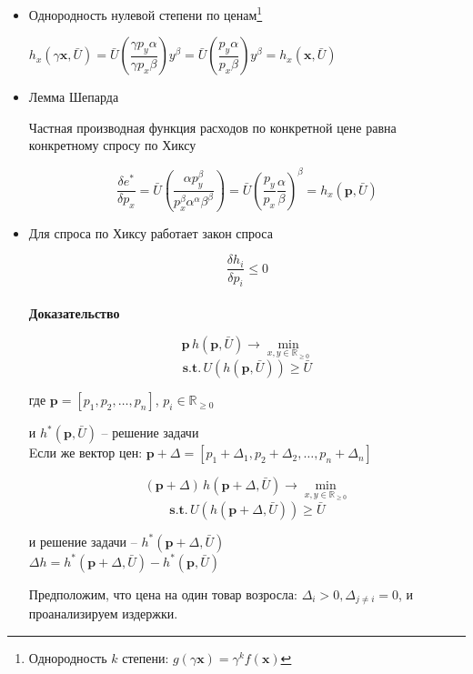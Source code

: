 \documentclass[reqno]{article}
\theoremstyle{definition}
\theoremstyle{definition}
\theoremstyle{definition}
\theoremstyle{definition}
\theoremstyle{definition}
\theoremstyle{definition}
\theoremstyle{definition}
\theoremstyle{definition}
\theoremstyle{definition}
\begin{document}
	\begin{itemize}
		\item Однородность нулевой степени по ценам\footnote{Однородность $k$ степени: $g(\gamma \textbf{x})=\gamma^k f(\textbf{x})$}
		
		$h_x(\gamma \textbf{x},\bar{U}) = \bar{U} \left(\dfrac{\gamma p_y \alpha}{\gamma p_x \beta} \right)y^\beta = \bar{U} \left(\dfrac{p_y \alpha}{p_x \beta} \right)y^\beta = h_x(\textbf{x},\bar{U})$ 
		\\
		 
		\item Лемма Шепарда 
		
		Частная производная функция расходов по конкретной цене равна конкретному спросу по Хиксу
		
		$$\dfrac{\delta e^*}{\delta p_x} = \bar{U} \left(\dfrac{\alpha p_y^\beta}{p_x^\beta \alpha^\alpha \beta^\beta} \right) = \bar{U} \left( \dfrac{p_y}{p_x} \dfrac{\alpha}{\beta} \right)^\beta = h_x(\textbf{p},\bar{U})$$ 
		
		\item Для спроса по Хиксу работает закон спроса
		
		$$\dfrac{\delta h_i}{\delta p_i} \leq 0$$ \\
		
		\textbf{Доказательство}
		
		$$\textbf{p} \, h(\textbf{p},\bar{U}) \rightarrow \min\limits_{x,y \in\mathds{R}_{\geq 0}}$$
		$$ \textbf{s.t.} \, U(h(\textbf{p}, \bar{U} )) \geq \bar{U} $$
		
		где $\textbf{p} = [p_1,p_2, \dots, p_n]$, $p_i \in\mathds{R}_{\geq 0}$ 
		
		и $h^*(\textbf{p},\bar{U})$ -- решение задачи\\
		
		Eсли же вектор цен: $\textbf{p} + \Delta = [p_1 + \Delta_1,p_2 + \Delta_2, \dots, p_n + \Delta_n]$
		
		$$(\textbf{p} + \Delta) \, h(\textbf{p} +\Delta,\bar{U}) \rightarrow \min\limits_{x,y \in\mathds{R}_{\geq 0}}$$
		$$ \textbf{s.t.} \, U(h(\textbf{p} +\Delta, \bar{U} )) \geq \bar{U} $$
		
		и решение задачи -- $h^*(\textbf{p} +\Delta,\bar{U})$\\
		
		$\Delta h = h^*(\textbf{p} +\Delta,\bar{U}) - h^*(\textbf{p},\bar{U})$
		
		Предположим, что цена на один товар возросла: $\Delta_i > 0, \Delta_{j \neq i} = 0$, и проанализируем издержки.
		

\end{itemize}
\end{document}

